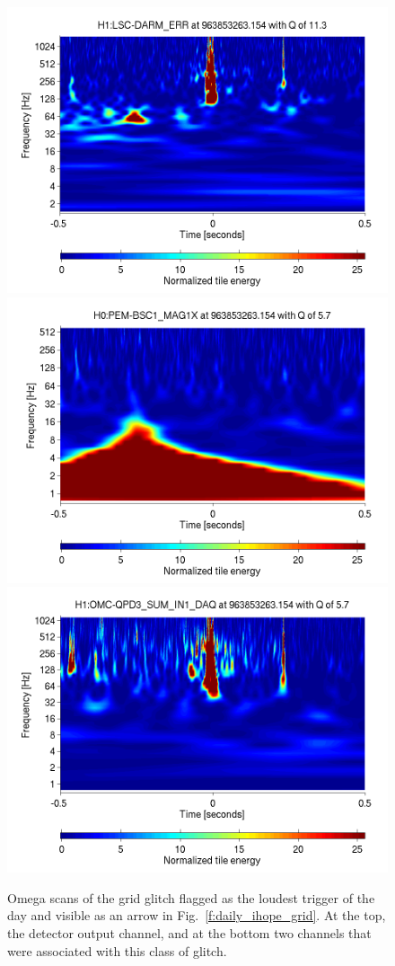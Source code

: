 \begin{figure}
  \includegraphics[width=\linewidth]{figures/detchar/963853263_154296875_H1_LSC-DARM_ERR_1_00_spectrogram_whitened}
  \includegraphics[width=0.5\linewidth]{figures/detchar/963853263_154296875_H0_PEM-BSC1_MAG1X_1_00_spectrogram_whitened}
  \includegraphics[width=0.5\linewidth]{figures/detchar/963853263_154296875_H1_OMC-QPD3_SUM_IN1_DAQ_1_00_spectrogram_whitened}
  \caption[Grid glitches in omega]{
  \label{f:omega_grid}
Omega scans of the grid glitch flagged as the loudest trigger of the
day and visible as an arrow in Fig.~\ref{f:daily_ihope_grid}.  At
the top, the detector output channel, and at the bottom two
channels that were associated with this class of glitch.
}
\end{figure}%


